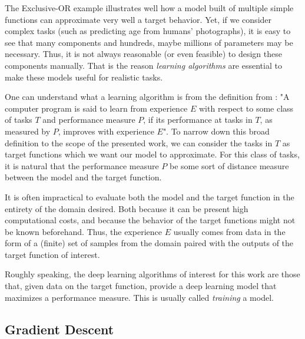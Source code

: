 The Exclusive-OR example illustrates well how a model built of multiple simple functions can approximate very well a target behavior.
Yet, if we consider complex tasks (such as predicting age from humans' photographs), it is easy to see that many components and hundreds, maybe millions of parameters may be necessary\footnotemark.
Thus, it is not always reasonable (or even feasible) to design these components manually.
That is the reason \textit{learning algorithms} are essential to make these models useful for realistic tasks.


One can understand what a learning algorithm is from the definition from \textcite{mitchell_machine_1997}:
"A computer program is said to learn from experience $E$ with respect to some class of tasks $T$ and performance measure $P$, if its performance at tasks in $T$, as measured by $P$, improves with experience $E$".
To narrow down this broad definition to the scope of the presented work, we can consider the tasks in $T$ as target functions which we want our model to approximate.
For this class of tasks, it is natural that the performance measure $P$ be some sort of distance measure between the model and the target function.

It is often impractical to evaluate both the model and the target function in the entirety of the domain desired.
Both because it can be present high computational costs, and because the behavior of the target functions might not be known beforehand.
Thus, the experience $E$ usually comes from data in the form of a (finite) set of samples from the domain paired with the outputs of the target function of interest.

Roughly speaking, the deep learning algorithms of interest for this work are those that, given data on the target function, provide a deep learning model that maximizes a performance measure.
This is usually called \emph{training} a model.

\subsection{Gradient Descent}

